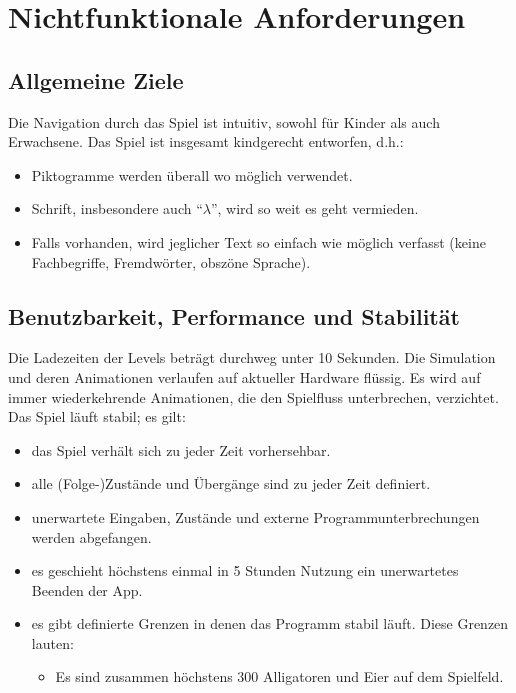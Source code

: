 \section{Nichtfunktionale Anforderungen}

\subsection{Allgemeine Ziele}
\begin{requirements}
	 Die Navigation durch das Spiel ist intuitiv, sowohl für Kinder als auch Erwachsene.
	 Das Spiel ist insgesamt kindgerecht entworfen, d.h.:
		\begin{itemize}
			\item Piktogramme werden überall wo möglich verwendet.
			\item Schrift, insbesondere auch "`$\lambda$"', wird so weit es geht vermieden.
			\item Falls vorhanden, wird jeglicher Text so einfach wie möglich verfasst (keine Fachbegriffe, Fremdwörter, obszöne Sprache).
		\end{itemize}
\end{requirements}

\subsection{Benutzbarkeit, Performance und Stabilität}
\begin{requirements}
	 Die Ladezeiten der Levels beträgt durchweg unter 10 Sekunden.
	 Die Simulation und deren Animationen verlaufen auf aktueller Hardware flüssig.
	 Es wird auf immer wiederkehrende Animationen, die den Spielfluss unterbrechen, verzichtet.
	 Das Spiel läuft stabil; es gilt:
		\begin{itemize}
			\item das Spiel verhält sich zu jeder Zeit vorhersehbar.
			\item alle (Folge-)Zustände und Übergänge sind zu jeder Zeit definiert.
			\item unerwartete Eingaben, Zustände und externe Programmunterbrechungen werden abgefangen.
			\item es geschieht höchstens einmal in 5 Stunden Nutzung ein unerwartetes Beenden der App.
			\item es gibt definierte Grenzen in denen das Programm stabil läuft. Diese Grenzen lauten:
				\begin{itemize}
					\item Es sind zusammen höchstens 300 Alligatoren und Eier auf dem Spielfeld.
				\end{itemize}
		\end{itemize}
\end{requirements}

